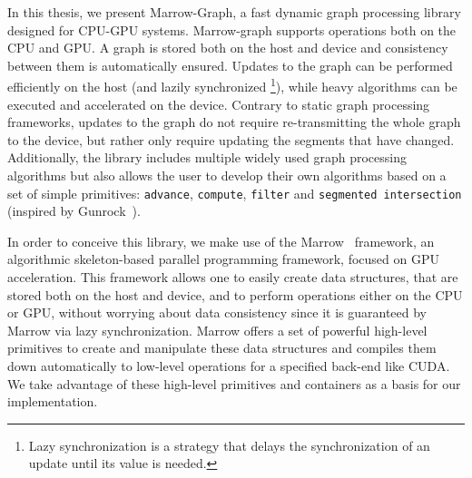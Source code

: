 In this thesis, we present Marrow-Graph, a fast dynamic graph processing library designed for \gls{CPU}-\gls{GPU} systems. Marrow-graph supports operations both on the \gls{CPU} and \gls{GPU}. A graph is stored both on the host and device and consistency between them is automatically ensured. Updates to the graph can be performed efficiently on the host (and lazily synchronized
\footnote{Lazy synchronization is a strategy that delays the synchronization of an update until its value is needed.}), 
while heavy algorithms can be executed and accelerated on the device. Contrary to static graph processing frameworks, updates to the graph do not require re-transmitting the whole graph to the device, but rather only require updating the segments that have changed. Additionally, the library includes multiple widely used graph processing algorithms but also allows the user to develop their own algorithms based on a set of simple primitives: \texttt{advance}, \texttt{compute}, \texttt{filter} and \texttt{segmented intersection} (inspired by Gunrock~\cite{paper:gunrock}).
%

In order to conceive this library, we make use of the Marrow~\cite{paper:marrow} framework, an algorithmic skeleton-based parallel
programming framework, focused on \gls{GPU} acceleration. This framework allows one to easily create data structures, that are stored both on the host and device, and to perform operations either on the \gls{CPU} or \gls{GPU}, without worrying about data consistency since it is guaranteed by Marrow via lazy synchronization. Marrow offers a set of powerful high-level primitives to create and manipulate these data structures and compiles them down automatically to low-level operations for a specified back-end like \gls{CUDA}. We take advantage of these high-level primitives and containers as a basis for our implementation.
%
%


